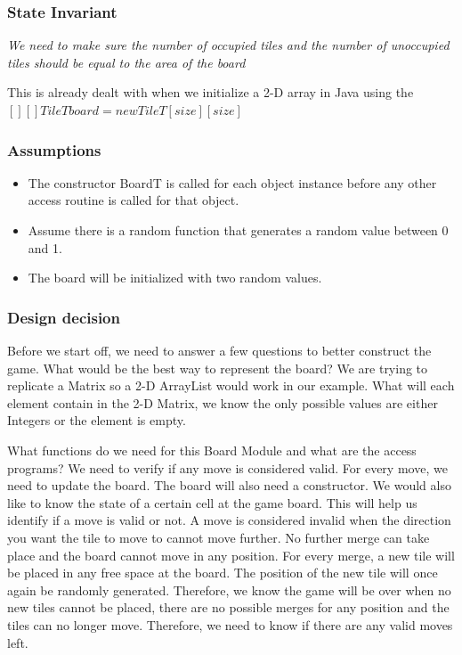 \documentclass[12pt]{article}
\begin{document}
\subsubsection* {State Invariant}

\noindent \textit{We need to make sure the number of occupied tiles and the number of unoccupied tiles
should be equal to the area of the board}



This is already dealt with when we initialize a 2-D array in Java using the $[][] TileT board = new TileT[size][size]$

\subsubsection* {Assumptions}

\begin{itemize}
  \item The constructor BoardT is called for each object instance before any other access routine
  is called for that object.
  \item Assume there is a random function that generates a random value between 0 and 1.
  \item The board will be initialized with two random values.
\end{itemize}

\subsubsection* {Design decision}

Before we start off, we need to answer a few questions to better construct the game. What would be the best way to represent the board? We are trying to replicate a Matrix so a 2-D ArrayList would work in our example. What will each element contain in the 2-D Matrix, we know the only possible values are either Integers or the element is empty.

What functions do we need for this Board Module and what are the access programs?
We need to verify if any move is considered valid. For every move, we need to update the board. The board will also need a constructor. We would also like to know the state of a certain cell at the game board. This will help us identify if a move is valid or not.
A move is considered invalid when the direction you want the tile to move to cannot move
further. No further merge can take place and the board cannot move in any position. For every merge, a new tile will be placed in any free space at the board. The position of the new tile will once again be randomly generated. Therefore, we know the game will be over when no new tiles cannot be placed, there are no possible merges for any position and the tiles can no longer move. Therefore, we need to know if there are any valid moves left.
\end{document}
